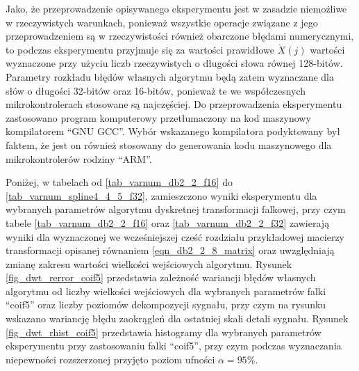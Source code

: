 Jako, że przeprowadzenie opisywanego eksperymentu jest w zasadzie niemożliwe w rzeczywistych warunkach, ponieważ wszystkie operacje związane z jego przeprowadzeniem są w rzeczywistości również obarczone błędami numerycznymi, to podczas eksperymentu przyjmuje się za wartości prawidłowe $\dot{X}(j)$ wartości wyznaczone przy użyciu liczb rzeczywistych o długości słowa równej 128-bitów. Parametry rozkładu błędów własnych algorytmu będą zatem wyznaczane dla słów o długości 32-bitów oraz 16-bitów, ponieważ te we współczesnych mikrokontrolerach stosowane są najczęściej. Do przeprowadzenia eksperymentu zastosowano program komputerowy przetłumaczony na kod maszynowy kompilatorem \enquote{GNU GCC}. Wybór wskazanego kompilatora podyktowany był faktem, że jest on również stosowany do generowania kodu maszynowego dla mikrokontrolerów rodziny \enquote{ARM}.

Poniżej, w tabelach od \ref{tab_varnum_db2_2_f16} do \ref{tab_varnum_spline4_4_5_f32}, zamieszczono wyniki eksperymentu dla wybranych parametrów algorytmu dyskretnej transformacji falkowej, przy czym tabele \ref{tab_varnum_db2_2_f16} oraz \ref{tab_varnum_db2_2_f32} zawierają wyniki dla wyznaczonej we wcześniejszej cześć rozdziału przykładowej macierzy transformacji opisanej równaniem \eqref{eqn_db2_2_8_matrix} oraz uwzględniają zmianę zakresu wartości wielkości wejściowych algorytmu. Rysunek \ref{fig_dwt_rerror_coif5} przedstawia zależność wariancji błędów własnych algorytmu od liczby wielkości wejściowych dla wybranych parametrów falki \enquote{coif5} oraz liczby poziomów dekompozycji sygnału, przy czym na rysunku wskazano wariancję błędu zaokrągleń dla ostatniej skali detali sygnału. Rysunek \ref{fig_dwt_rhist_coif5} przedstawia histogramy dla wybranych parametrów eksperymentu przy zastosowaniu falki \enquote{coif5}, przy czym podczas wyznaczania niepewności rozszerzonej przyjęto poziom ufności $\alpha = 95\%$.

